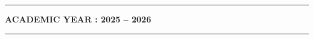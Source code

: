 \begin{titlepage}
\begin{flushleft}
\end{flushleft}

\vfill

\textcolor{titleblue}{\rule{\textwidth}{0.8pt}}
\vspace{4pt}
\begin{center}
  {\fontsize{11pt}{13pt}\selectfont\textbf{\textcolor{titleblue}{ACADEMIC YEAR : 2025 -- 2026}}}
\end{center}
\vspace{6pt}
\textcolor{titleblue}{\rule{\textwidth}{2.5pt}}

\end{titlepage}
